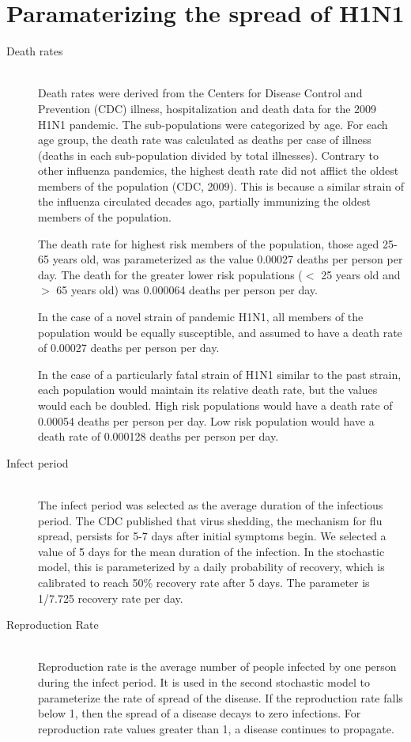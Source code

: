 \documentclass[titlepage]{article}
\begin{document}
\section{Paramaterizing the spread of H1N1}

\begin{description}
\item[Death rates]\hfill \\
Death rates were derived from the Centers for Disease Control and Prevention (CDC) illness, hospitalization and death data for the 2009 H1N1 pandemic. The sub-populations were categorized by age. For each age group, the death rate was calculated as deaths per case of illness (deaths in each sub-population divided by total illnesses). Contrary to other influenza pandemics, the highest death rate did not afflict the oldest members of the population  (CDC, 2009). This is because a similar strain of the influenza circulated decades ago, partially immunizing the oldest members of the population.

The death rate for highest risk members of the population, those aged 25-65 years old, was parameterized as the value 0.00027 deaths per person per day. The death for the greater lower risk populations ($<$ 25 years old and $>$ 65 years old) was 0.000064 deaths per person per day.

In the case of a novel strain of pandemic H1N1, all members of the population would be equally susceptible, and assumed to have a death rate of 0.00027 deaths per person per day.

In the case of a particularly fatal strain of H1N1 similar to the past strain, each population would maintain its relative death rate, but the values would each be doubled. High risk populations would have a death rate of 0.00054 deaths per person per day. Low risk population would have a death rate of 0.000128 deaths per person per day.

\item[Infect period]\hfill \\
The infect period was selected as the average duration of the infectious period. The CDC published that virus shedding, the mechanism for flu spread, persists for 5-7 days after initial symptoms begin. We selected a value of 5 days for the mean duration of the infection. In the stochastic model, this is parameterized by a daily probability of recovery, which is calibrated to reach 50\% recovery rate after 5 days. The parameter is 1/7.725 recovery rate per day.

\item[Reproduction Rate]\hfill \\
Reproduction rate is the average number of people infected by one person during the infect period. It is used in the second stochastic model to parameterize the rate of spread of the disease. If the reproduction rate falls below 1, then the spread of a disease decays to zero infections. For reproduction rate values greater than 1, a disease continues to propagate.


\end{description}
\end{document}
